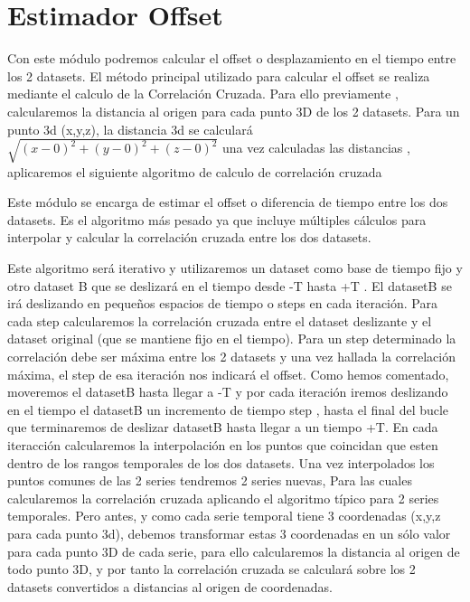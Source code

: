 \section{Estimador Offset}

	Con este módulo podremos calcular el offset o desplazamiento en el tiempo entre los 2 datasets.
	El método principal utilizado para calcular el offset se realiza mediante el calculo de la Correlación Cruzada.
	Para ello previamente , calcularemos la distancia al origen para cada punto 3D de los 2 datasets.
	Para un punto 3d (x,y,z), la distancia 3d se calculará 
	\begin{math}
	\sqrt{(x-0)^2 +(y-0)^2+(z-0)^2}
	\end{math}
	una vez calculadas las distancias , aplicaremos el siguiente algoritmo de calculo de correlación cruzada

Este módulo se encarga de estimar el offset o diferencia de tiempo entre los dos datasets. Es el algoritmo más pesado ya que incluye múltiples cálculos para interpolar y calcular 
la correlación cruzada entre los dos datasets.

Este algoritmo será iterativo y utilizaremos un dataset como base de tiempo fijo y otro dataset B que se deslizará en el tiempo desde -T hasta +T . El datasetB se irá 
deslizando en pequeños espacios de tiempo o steps en cada iteración. Para cada step calcularemos la correlación cruzada entre el dataset deslizante y el dataset original (que se 
mantiene fijo en el tiempo). Para un step determinado la correlación debe ser máxima entre los 2 datasets y una vez hallada la correlación máxima, el step de esa iteración nos 
indicará el offset. Como hemos comentado, moveremos el datasetB hasta llegar a -T y por cada iteración iremos deslizando en el tiempo el datasetB un incremento de tiempo step , hasta el final del bucle que terminaremos de deslizar datasetB hasta llegar a un tiempo +T. En cada iteracción calcularemos la interpolación en los puntos que coincidan que esten dentro de los rangos temporales de los dos datasets. Una vez interpolados los puntos comunes de las 2 series tendremos 2 series nuevas, Para las cuales calcularemos la correlación cruzada aplicando el algoritmo típico para 2 series temporales. Pero antes, y como cada serie temporal tiene 3 coordenadas (x,y,z para cada punto 3d), debemos transformar estas 3 coordenadas en un sólo valor para cada punto 3D de cada serie, para ello calcularemos la distancia al origen de todo punto 3D, y por tanto la correlación cruzada se calculará sobre los 2 datasets convertidos a distancias al origen de coordenadas.

